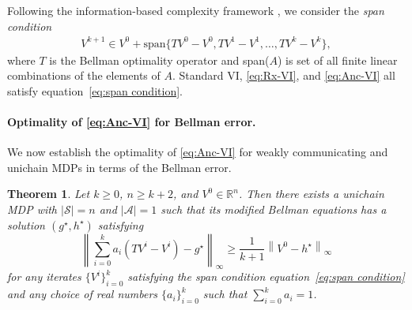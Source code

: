 \documentclass{article} %
\def\eqref#1{equation~\ref{#1}}
\newcommand{\cA}{\mathcal{A}}
\newcommand{\cS}{\mathcal{S}}
\newcommand{\cP}{\mathcal{P}}
\newcommand{\real}{\mathbb{R}}
\newcommand*{\para}[1]{\left({#1}\right)}
\newcommand*{\infn}[1]{\left\|{#1}\right\|_{\infty}}
\newtheorem{theorem}{Theorem}
\begin{document}
Following the information-based complexity framework \citep{nemirovski1992information}, we consider the \emph{span condition}
\begin{align}
V^{k+1} \in V^0+\mathrm{span}\{TV^0-V^0, TV^1-V^1, \dots, TV^{k}-V^{k}\} ,
    \label{eq:span condition}
\end{align}
where $T$ is the Bellman optimality operator and span($A$) is set of all finite linear combinations of the elements of $A$.
Standard VI, \ref{eq:Rx-VI}, and \ref{eq:Anc-VI} all satisfy \eqref{eq:span condition}.


\paragraph{Optimality of \ref{eq:Anc-VI} for Bellman error.}
We now establish the optimality of \ref{eq:Anc-VI} for weakly communicating and unichain MDPs in terms of the Bellman error.
\begin{theorem}\label{thm::comp_lower_bd_commu}
Let $k\ge 0$, $n \ge k+2$, and $V^0 \in \real^n$. Then there exists a unichain MDP with $|\mathcal{S}|=n$ and $|\mathcal{A}|=1$ such that its modified Bellman equations has a solution $(g^\star,h^{\star})$ satisfying
\[ \infn{\sum^{k}_{i=0} a_i (TV^i-V^i)-g^{\star}} \ge \frac{1}{k+1}\infn{V^0-h^{\star}} \]
for any iterates $\{V^i\}^{k}_{i=0}$ satisfying the span condition \eqref{eq:span condition}
     and any choice of real numbers $\{a_i\}^k_{i=0}$ such that $\sum^k_{i=0}a_i=1 $.
\end{theorem}
\end{document}
